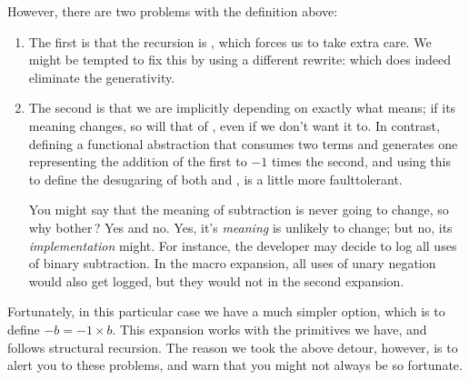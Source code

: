 However, there are two problems with the definition above:
\begin{enumerate}

\item
The first is that the recursion is , which forces us to take extra care. We might be tempted to fix
this by using a different rewrite:
which does indeed eliminate the generativity.


\item
The second is that we are implicitly depending on exactly what 
means; if its meaning changes, so will that of , even if we don’t
want it to. In contrast, defining a functional abstraction that consumes two
terms and generates one representing the addition of the first to $-1$ times the
second, and using this to define the desugaring of both  and
, is a little more faulttolerant.

You might say that the meaning of subtraction is never going to change, so why
bother\,? Yes and no. Yes, it’s \emph{meaning} is unlikely to change; but no,
its \emph{implementation} might. For instance, the developer may decide to log
all uses of binary subtraction. In the macro expansion, all uses of unary
negation would also get logged, but they would not in the second expansion.

\end{enumerate}

Fortunately, in this particular case we have a much simpler option, which is to
define $-b=-1\times b$. This expansion works with the primitives we have, and
follows structural recursion. The reason we took the above detour, however, is
to alert you to these problems, and warn that you might not always be so
fortunate.
